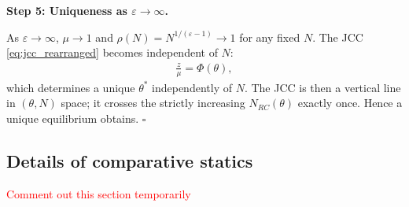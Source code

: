 \documentclass[authoryear, review, 12pt]{elsarticle}
\begin{document}
\medskip\noindent\textbf{Step 5: Uniqueness as $\varepsilon\to\infty$.}

As $\varepsilon\to\infty$, $\mu\to 1$ and $\rho(N)=N^{1/(\varepsilon-1)}\to 1$
for any fixed $N$.  The JCC \eqref{eq:jcc_rearranged} becomes independent of $N$:
\begin{align}
  \frac{z}{\mu} = \Phi(\theta),
\end{align}
which determines a unique $\theta^*$ independently of $N$.  The JCC is then
a vertical line in $(\theta,N)$ space; it crosses the strictly increasing
$N_{RC}(\theta)$ exactly once.  Hence a unique equilibrium obtains.
\hfill$\square$


	\subsection{Details of comparative statics}
	\textcolor{red}{Comment out this section temporarily}
\end{document}

